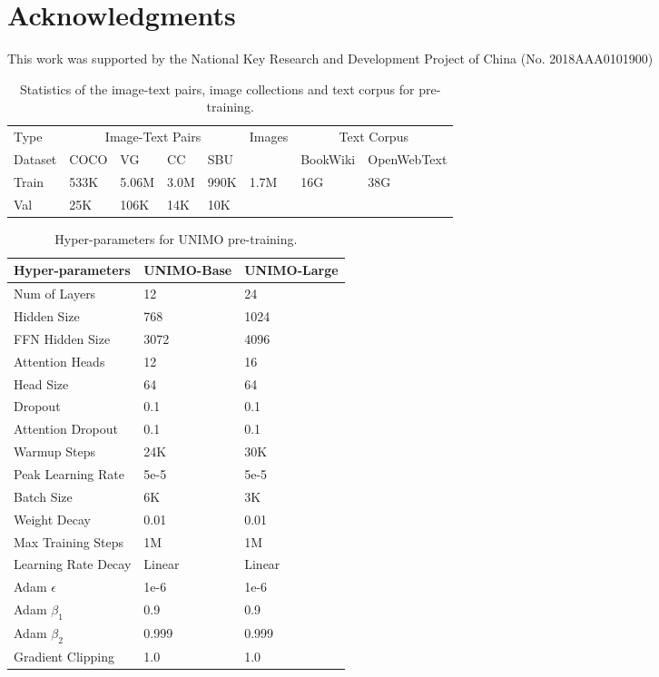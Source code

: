 \documentclass[11pt,a4paper]{article}
\begin{document}
\section*{Acknowledgments}
This work was supported by the National Key Research and Development Project of China (No. 2018AAA0101900)




\cleardoublepage

\appendix


\begin{table*}[t!]
\centering
\small
\begin{tabular}{l|l|l|l|l|l|l|l}
\hline
Type& \multicolumn{4}{c|}{Image-Text Pairs} & \multirow{2}{*}{Images} & \multicolumn{2}{c}{Text Corpus} \\
\cline{1-5} \cline{7-8}
Dataset & COCO & VG & CC & SBU & & BookWiki & OpenWebText \\
\hline
Train & 533K & 5.06M & 3.0M & 990K & 1.7M & 16G & 38G \\
Val & 25K & 106K & 14K & 10K & & & \\
\hline
\end{tabular}
\caption{\label{pretrain-dataset}
Statistics of the image-text pairs, image collections and text corpus for pre-training.}
\end{table*}



\begin{table}[t!]
\centering
\small
\begin{tabular}{l|l|l}
\hline
Hyper-parameters & UNIMO-Base & UNIMO-Large\\
\hline
Num of Layers & 12 & 24 \\
Hidden Size & 768 & 1024 \\
FFN Hidden Size & 3072 & 4096 \\
Attention Heads & 12 & 16 \\
Head Size & 64 & 64 \\
Dropout & 0.1 & 0.1 \\
Attention Dropout & 0.1 & 0.1 \\
Warmup Steps & 24K & 30K \\
Peak Learning Rate & 5e-5 & 5e-5 \\
Batch Size & 6K & 3K \\
Weight Decay & 0.01 & 0.01 \\
Max Training Steps & 1M & 1M \\
Learning Rate Decay & Linear & Linear \\
Adam $\epsilon$ & 1e-6 & 1e-6 \\
Adam $\beta_1$ & 0.9 & 0.9 \\
Adam $\beta_2$ & 0.999 & 0.999 \\
Gradient Clipping & 1.0 & 1.0 \\
\hline
\end{tabular}
\caption{\label{pre-params}
Hyper-parameters for UNIMO pre-training.}
\end{table}
\end{document}
